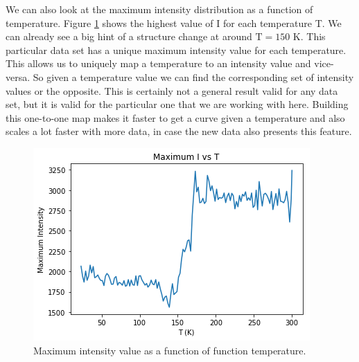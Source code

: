 We can also look at the maximum intensity distribution as a function of temperature. Figure \ref{fig:maxI} shows the highest value of I for each temperature T. We can already see a big hint of a structure change at around $\textrm{T} = 150 \textrm{ K}$. This particular data set has a unique maximum intensity value for each temperature. This allows us to uniquely map a temperature to an intensity value and vice-versa. So given a temperature value we can find the corresponding set of intensity values or the opposite.
This is certainly not a general result valid for any data set, but it is valid for the particular one that we are working with here. Building this one-to-one map makes it faster to get a curve given a temperature and also scales a lot faster with more data, in case the new data also presents this feature.

\begin{figure}[h]
  \centering
  \includegraphics[scale=0.35]{../figs/maxI.png}
  \caption{Maximum intensity value as a function of function temperature.}
  \label{fig:maxI}
\end{figure}

